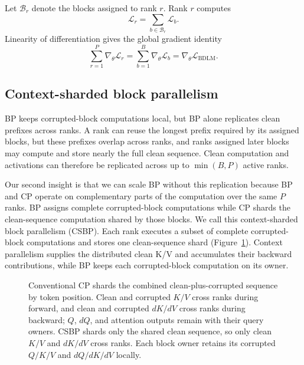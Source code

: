 Let $\mathcal{B}_r$ denote the blocks assigned to rank $r$. Rank $r$ computes
\begin{equation}
    \mathcal{L}_r
    =
    \sum_{b\in\mathcal{B}_r}
    \mathcal{L}_b.
    \label{eq:local-block-loss}
\end{equation}
Linearity of differentiation gives the global gradient identity
\begin{equation}
    \sum_{r=1}^{P}\nabla_\theta\mathcal{L}_r
    =
    \sum_{b=1}^{B}\nabla_\theta\mathcal{L}_b
    =
    \nabla_\theta\mathcal{L}_{\mathrm{BDLM}}.
    \label{eq:block-gradient-sum}
\end{equation}

\subsection{Context-sharded block parallelism}
\label{sec:context-sharded-block-parallelism}

BP keeps corrupted-block computations local, but BP alone replicates clean
prefixes across ranks. A rank can reuse the longest prefix required by its
assigned blocks, but these prefixes overlap across ranks, and ranks assigned
later blocks may compute and store nearly the full clean sequence. Clean
computation and activations can therefore be replicated across up to
$\min(B,P)$ active ranks.

Our second insight is that we can scale BP without this replication because BP
and CP operate on complementary parts of the computation over the same $P$
ranks. BP assigns complete corrupted-block computations while CP shards the
clean-sequence computation shared by those blocks. We call this
context-sharded block parallelism (CSBP). Each rank executes a subset of
complete corrupted-block computations and stores one clean-sequence shard
(Figure~\ref{fig:csbp}). Context parallelism supplies the distributed clean
K/V and accumulates their backward contributions, while BP keeps each
corrupted-block computation on its owner.

\begin{figure}[t]
    \centering
    \resizebox{\linewidth}{!}{}
    \caption{Conventional CP shards the combined clean-plus-corrupted sequence
    by token position. Clean and corrupted $K/V$ cross ranks during forward,
    and clean and corrupted $dK/dV$ cross ranks during backward; $Q$, $dQ$, and
    attention outputs remain with their query owners. CSBP shards only the
    shared clean sequence, so only clean $K/V$ and $dK/dV$ cross ranks. Each
    block owner retains its corrupted $Q/K/V$ and $dQ/dK/dV$ locally.}
    \label{fig:csbp}
\end{figure}

